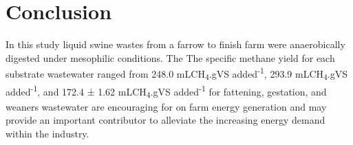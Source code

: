 \section{Conclusion}
In this study liquid swine wastes from a farrow to finish farm were anaerobically digested under mesophilic conditions. The The specific methane yield for each substrate wastewater ranged from 248.0 mLCH\textsubscript{4}.gVS added\textsuperscript{-1}, 293.9 mLCH\textsubscript{4}.gVS added\textsuperscript{-1}, and 172.4 ± 1.62 mLCH\textsubscript{4}.gVS added\textsuperscript{-1} for fattening, gestation, and weaners wastewater are encouraging for on farm energy generation and may provide an important contributor to alleviate the increasing energy demand within the industry.